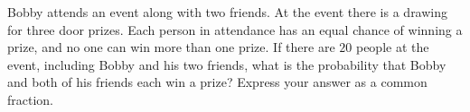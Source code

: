 Bobby attends an event along with two friends. At the event there is a drawing for three door prizes. Each person in attendance has an equal chance of winning a prize, and no one can win more than one prize. If there are $20$ people at the event, including Bobby and his two friends, what is the probability that Bobby and both of his friends each win a prize? Express your answer as a common fraction.
